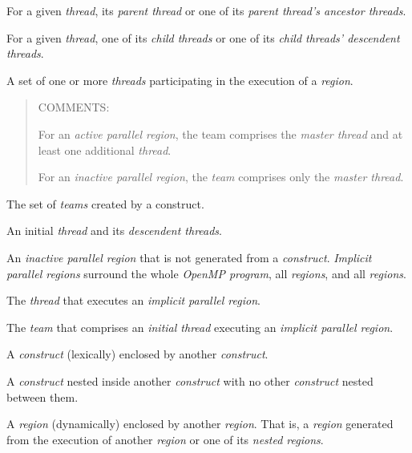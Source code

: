 \glossarydefstart
For a given \emph{thread}, its \emph{parent thread} or one of its \emph{parent thread's ancestor threads}.
\glossarydefend

\glossarydefstart
For a given \emph{thread}, one of its \emph{child threads} or one of
its \emph{child threads' descendent threads}.
\glossarydefend

\glossarydefstart
A set of one or more \emph{threads} participating in the execution of a 
\emph{region}.

\begin{quote}
COMMENTS:

For an \emph{active parallel region}, the team comprises the \emph{master thread}
and at least one additional \emph{thread}.

For an \emph{inactive parallel region}, the \emph{team} comprises only the \emph{master thread}.
\end{quote}
\glossarydefend

\glossarydefstart
The set of \emph{teams} created by a  construct.
\glossarydefend

\glossarydefstart
An initial \emph{thread} and its \emph{descendent threads}.
\glossarydefend

\glossarydefstart
An \emph{inactive parallel region} that is not generated from a
 \emph{construct}. \emph{Implicit parallel regions} surround the whole
\emph{OpenMP program}, all  \emph{regions}, and all 
\emph{regions}.

\glossarydefend

\glossarydefstart
The \emph{thread} that executes an \emph{implicit parallel region}.
\glossarydefend

\glossarydefstart
The \emph{team} that comprises an \emph{initial thread} executing an \emph{implicit parallel region}.
\glossarydefend

\glossarydefstart
A \emph{construct} (lexically) enclosed by another \emph{construct}.
\glossarydefend

\glossarydefstart
A \emph{construct} nested inside another \emph{construct} with no other \emph{construct} nested
between them.
\glossarydefend

\glossarydefstart
A \emph{region} (dynamically) enclosed by another \emph{region}.  That is, a
\emph{region} generated from the execution of another \emph{region}
or one of its \emph{nested regions}.

